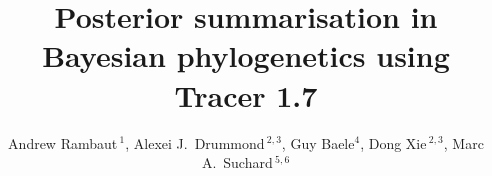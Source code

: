 \documentclass{bioinfo_tracer}
\begin{document}

\title[Tracer]{Posterior summarisation in Bayesian phylogenetics using Tracer 1.7}

\author[Rambaut \textit{et~al.}]{
Andrew Rambaut\,$^{1}$,
Alexei J.~Drummond\,$^{2,3}$,
Guy Baele$^{4}$,
Dong Xie\,$^{2,3}$,
Marc A.~Suchard\,$^{5,6}$
}

\address{
$^{1}$Institute of Evolutionary Biology, University of Edinburgh, Edinburgh, UK \\
$^{2}$Department of Computer Science, University of Auckland, Auckland, NZ \\
$^{3}$Centre for Computational Evolution, University of Auckland, Auckland, NZ \\
$^{4}$Department of Microbiology and Immunology, Rega Institute, KU Leuven, Leuven, Belgium\\
$^{5}$Department of Human Genetics, University of California, Los Angeles, USA \\
$^{6}$Department of Biostatistics, University of California, Los Angeles, USA \\
}



\maketitle
\end{document}
